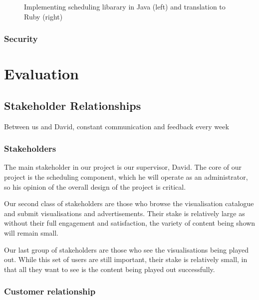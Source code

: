 \documentclass[a4paper, titlepage]{article}
\begin{document}
\begin{figure}[ht]
  \begin{minipage}{0.49\textwidth}
  \end{minipage}
  \begin{minipage}{0.49\textwidth}
  \end{minipage}
    
  \caption{Implementing scheduling libarary in Java (left) and translation to Ruby (right)}
  \label{fig:impl_translation}
\end{figure}


\subsubsection{Security}



\newpage
\section{Evaluation}

\subsection{Stakeholder Relationships}
Between us and David, constant communication and feedback every week


\subsubsection{Stakeholders}

The main stakeholder in our project is our supervisor, David. The core of our project is the scheduling component, which he will operate as an administrator, so his opinion of the overall design of the project is critical.

Our second class of stakeholders are those who browse the visualisation catalogue and submit visualisations and advertisements. Their stake is relatively large as without their full engagement and satisfaction, the variety of content being shown will remain small. 

Our last group of stakeholders are those who see the visualisations being played out. While this set of users are still important, their stake is relatively small, in that all they want to see is the content being played out successfully.

\subsubsection{Customer relationship}
\end{document}
